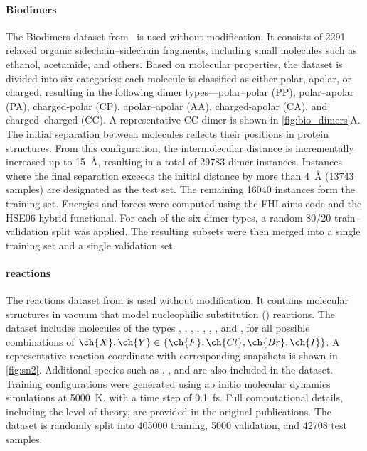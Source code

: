 \documentclass[10pt]{article} %
\begin{document}
\paragraph{Biodimers}
The Biodimers dataset from~\cite{hlhc2023, burns2017biofragment} is used without modification. It consists of \num{2291} relaxed organic sidechain–sidechain fragments, including small molecules such as ethanol, acetamide, and others.
%
Based on molecular properties, the dataset is divided into six categories: each molecule is classified as either polar, apolar, or charged, resulting in the following dimer types—polar–polar (PP), polar–apolar (PA), charged-polar (CP), apolar–apolar (AA), charged-apolar (CA), and charged–charged (CC). A representative CC dimer is shown in \cref{fig:bio_dimers}A.
%
The initial separation between molecules reflects their positions in protein structures. From this configuration, the intermolecular distance is incrementally increased up to \qty{15}{\angstrom}, resulting in a total of \num{29783} dimer instances.
%
Instances where the final separation exceeds the initial distance by more than \qty{4}{\angstrom} (\num{13743} samples) are designated as the test set. The remaining \num{16040} instances form the training set. Energies and forces were computed using the FHI-aims code and the HSE06 hybrid functional. For each of the six dimer types, a random \num{80}/\num{20} train–validation split was applied. The resulting subsets were then merged into a single training set and a single validation set.

\paragraph{\sn reactions}
The \sn reactions dataset from \cite{um2019, fcmu2024} is used without modification. It contains molecular structures in vacuum that model nucleophilic substitution (\sn) reactions. The dataset includes molecules of the types , , , , , , , and , for all possible combinations of \( \ch{X}, \ch{Y} \in \{\ch{F}, \ch{Cl}, \ch{Br}, \ch{I}\} \). A representative reaction coordinate with corresponding snapshots is shown in \cref{fig:sn2}. Additional species such as , , and  are also included in the dataset.
%
Training configurations were generated using ab initio molecular dynamics simulations at \qty{5000}{\kelvin}, with a time step of \qty{0.1}{\femto\second}. Full computational details, including the level of theory, are provided in the original publications. The dataset is randomly split into \num{405000} training, \num{5000} validation, and \num{42708} test samples.
\end{document}
